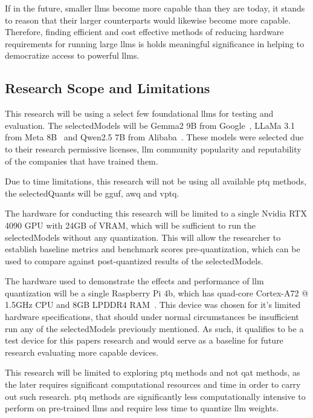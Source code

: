 \documentclass{ifacconf}
\begin{document}
	If in the future, smaller \glspl{llm} become more capable than they are today, it stands to reason that their larger counterparts would likewise become more capable. Therefore, finding efficient and cost effective methods of reducing hardware requirements for running large \glspl{llm} is holds meaningful significance in helping to democratize access to powerful \glspl{llm}.
	
	\subsection{Research Scope and Limitations}
	This research will be using a select few foundational \glspl{llm} for testing and evaluation. The \gls{selectedModels} will be Gemma2 9B from Google~\cite{gemmateam2024gemma2improvingopen}, LLaMa 3.1 from Meta 8B~\cite{dubey2024llama3herdmodels} and Qwen2.5 7B from Alibaba~\cite{qwen2.5}. These models were selected due to their research permissive licenses, \gls{llm} community popularity and reputability of the companies that have trained them.
	
	Due to time limitations, this research will not be using all available \gls{ptq} methods, the \gls{selectedQuants} will be \gls{gguf}, \gls{awq} and \gls{vptq}.
	
	The hardware for conducting this research will be limited to a single Nvidia RTX 4090 GPU with 24GB of VRAM, which will be sufficient to run the \gls{selectedModels} without any quantization. This will allow the researcher to establish baseline metrics and benchmark scores pre-quantization, which can be used to compare against post-quantized results of the \gls{selectedModels}.
	
	The hardware used to demonstrate the effects and performance of \gls{llm} quantization will be a single Raspberry Pi 4b, which has quad-core Cortex-A72 @ 1.5GHz CPU and 8GB LPDDR4 RAM~\cite{raspberrypi4}. This device was chosen for it's limited hardware specifications, that should under normal circumstances be insufficient run any of the \gls{selectedModels} previously mentioned. As such, it qualifies to be a test device for this papers research and would serve as a baseline for future research evaluating more capable devices.
	
	This research will be limited to exploring \gls{ptq} methods and not \gls{qat} methods, as the later requires significant computational resources and time in order to carry out such research. \gls{ptq} methods are significantly less computationally intensive to perform on pre-trained \glspl{llm} and require less time to quantize \gls{llm} weights.
	
\end{document}
